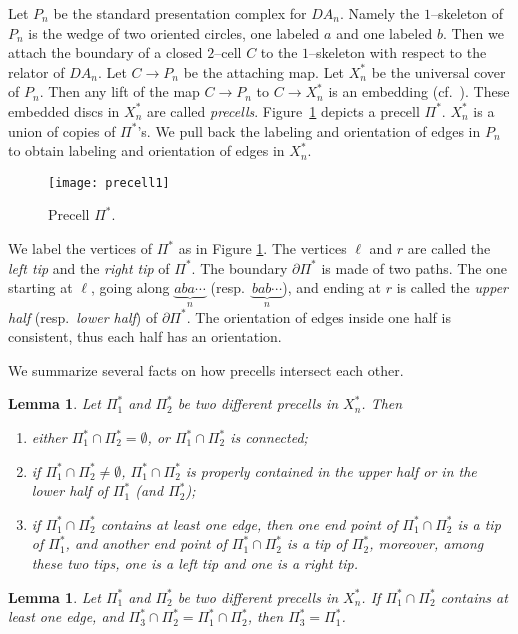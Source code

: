 \documentclass[11pt]{amsart}
\newtheorem{lemma}[theorem]{Lemma}
\theoremstyle{definition}
\newcommand{\Xa}{X^{\ast}}
\newcommand{\Pa}{\Pi^{\ast}}
\newcommand{\corfourthree}{Corollary 4.3}
\begin{document}
Let $P_n$ be the standard presentation complex for $DA_n$. Namely the $1$--skeleton of $P_n$ is the wedge of two oriented circles, one labeled $a$ and one labeled $b$. Then we attach the boundary of a closed $2$--cell $C$ to the $1$--skeleton with respect to the relator of $DA_n$. Let $C\to P_n$ be the attaching map. Let $\Xa_n$ be the universal cover of $P_n$. Then any lift of the map $C\to P_n$ to $C\to \Xa_n$ is an embedding (cf.\ \cite[Corollary 3.3]{Artinsystolic}). These embedded discs in $\Xa_n$ are called \emph{precells}. Figure~\ref{f:precell} depicts a precell $\Pa$. $\Xa_n$ is a union of copies of $\Pa$'s.
We pull back the labeling and orientation of edges in $P_n$ to obtain labeling and orientation of edges in $\Xa_n$.
\begin{figure}[h!]
	\centering
	\texttt{[image: precell1]}
	\caption{Precell $\Pa$.}
	\label{f:precell}
\end{figure}
We label the vertices of $\Pa$ as in Figure \ref{f:precell}. The vertices $\ell$ and $r$ are called the \emph{left tip} and the \emph{right tip} of $\Pa$. The boundary $\partial\Pa$ is made of two paths. The one starting at $\ell$, going along $\underbrace{aba\cdots}_{n}$ (resp.\ $\underbrace{bab\cdots}_{n}$), and ending at $r$ is called the \emph{upper half} (resp.\ \emph{lower half}) of $\partial\Pa$. The orientation of edges inside one half is consistent, thus each half has an orientation. 

We summarize several facts on how precells intersect each other. 
\begin{lemma}
	\label{cor:connected intersection}
	\cite[Corollary 3.4]{Artinsystolic}
	Let $\Pa_1$ and $\Pa_2$ be two different precells in $\Xa_n$. Then 
	\begin{enumerate}
		\item either $\Pa_1\cap\Pa_2=\emptyset$, or $\Pa_1\cap\Pa_2$ is connected;
		\item if $\Pa_1\cap\Pa_2\neq\emptyset$, $\Pa_1\cap\Pa_2$ is properly contained in the upper half or in the lower half of $\Pa_1$ (and $\Pa_2$);
		\item if $\Pa_1\cap\Pa_2$ contains at least one edge, then one end point of $\Pa_1\cap\Pa_2$ is a tip of $\Pa_1$, and another end point of $\Pa_1\cap\Pa_2$ is a tip of $\Pa_2$, moreover, among these two tips, one is a left tip and one is a right tip.
	\end{enumerate}
\end{lemma}

\begin{lemma}
	\cite[\corfourthree]{Artinmetric}
	\label{lem:unique}
	Let $\Pa_1$ and $\Pa_2$ be two different precells in $\Xa_n$. If $\Pa_1\cap\Pa_2$ contains at least one edge, and $\Pa_3\cap\Pa_2=\Pa_1\cap\Pa_2$, then $\Pa_3=\Pa_1$. 
\end{lemma}
\end{document}

